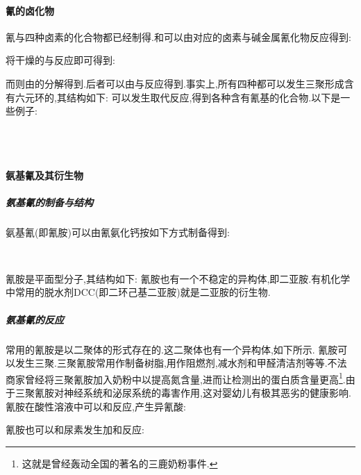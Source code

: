 \documentclass{ctexart}
\begin{document}
\paragraph{氰的卤化物}
氰与四种卤素的化合物都已经制得.和可以由对应的卤素与碱金属氰化物反应得到:
\begin{center}
\end{center}
将干燥的与反应即可得到:
\begin{center}
\end{center}
而则由的分解得到.后者可以由与反应得到.事实上,所有四种都可以发生三聚形成含有六元环的,其结构如下:
可以发生取代反应,得到各种含有氰基的化合物.以下是一些例子:
\begin{center}
    \\
    \\
\end{center}
\paragraph{氨基氰及其衍生物}
\subparagraph{氨基氰的制备与结构}
氨基氰(即氰胺)可以由氰氨化钙按如下方式制备得到:
\begin{center}
    \\
\end{center}
氰胺是平面型分子,其结构如下:
氰胺也有一个不稳定的异构体,即二亚胺.有机化学中常用的脱水剂DCC(即二环己基二亚胺)就是二亚胺的衍生物.
\subparagraph{氨基氰的反应}
\indent 常用的氰胺是以二聚体的形式存在的.这二聚体也有一个异构体,如下所示.
氰胺可以发生三聚.三聚氰胺常用作制备树脂,用作阻燃剂,减水剂和甲醛清洁剂等等.不法商家曾经将三聚氰胺加入奶粉中以提高氮含量,进而让检测出的蛋白质含量更高\footnote{这就是曾经轰动全国的著名的三鹿奶粉事件.}.由于三聚氰胺对神经系统和泌尿系统的毒害作用,这对婴幼儿有极其恶劣的健康影响.
氰胺在酸性溶液中可以和反应,产生异氰酸:
\begin{center}
\end{center}
氰胺也可以和尿素发生加和反应:
\begin{center}
\end{center}
\end{document}
